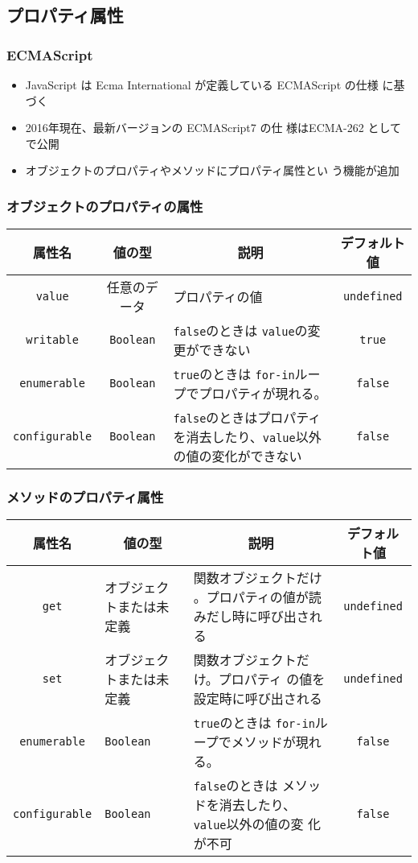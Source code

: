 \subsection{プロパティ属性}
\begin{frame}[containsverbatim]
 \frametitle{ECMAScript}
\begin{itemize}
 \item JavaScript は Ecma International が定義している ECMAScript の仕様
       に基づく
 \item 2016年現在、最新バージョンの ECMAScript7 の仕
様はECMA-262 としてで公開
 \item オブジェクトのプロパティやメソッドにプロパティ属性とい
う機能が追加
\end{itemize}
\end{frame}
\begin{frame}[containsverbatim]
 \frametitle{オブジェクトのプロパティの属性}
\begin{center}\setlength{\tabcolsep}{0.2em}
 \begin{tabular}{|c|c|m{}|c|}\hline
 属性名 & {値の型}& \multicolumn{1}{c|}{説明}&
デフォルト値\\\hline
  \texttt{value}& 任意のデータ&プロパティの値&\texttt{undefined}\\ \hline
  \texttt{writable}&\texttt{Boolean}& \texttt{false}のときは
	  \texttt{value}の変更ができない&\texttt{true}\\ \hline
  \texttt{enumerable}&\texttt{Boolean}& \texttt{true}のときは
	  \texttt{for-in}ループでプロパティが現れる。&\texttt{false}\\ \hline
  \texttt{configurable}&\texttt{Boolean}&\texttt{false}のときはプロパティ
	  を消去したり、\texttt{value}以外の値の変化ができない&\texttt{false}\\ \hline
 \end{tabular}
\end{center}
\end{frame}
\begin{frame}[containsverbatim]
 \frametitle{メソッドのプロパティ属性}
\begin{center}\setlength{\tabcolsep}{0.2em}
 \begin{tabular}{|c|m{}|m{}|c|}\hline
 属性名 & \multicolumn{1}{c|}{値の型}& \multicolumn{1}{c|}{説明}& デフォルト値 \\\hline
  \texttt{get}& オブジェクトまたは未定義&関数オブジェクトだけ
	  。プロパティの値が読みだし時に呼び出される&\texttt{undefined}\\ \hline
  \texttt{set}&オブジェクトまたは未定義& 関数オブジェクトだけ。プロパティ
	  の値を設定時に呼び出される&\texttt{undefined}\\ \hline 
  \texttt{enumerable}&\texttt{Boolean}& \texttt{true}のときは
	  \texttt{for-in}ループでメソッドが現れる。&\texttt{false}\\ \hline
  \texttt{configurable}&\texttt{Boolean}&\texttt{false}のときは
					{\color{red}メソッド}を消去したり、\texttt{value}以外の値の変
					化が不可&\texttt{false}\\ \hline
 \end{tabular}
\end{center}
\end{frame}
